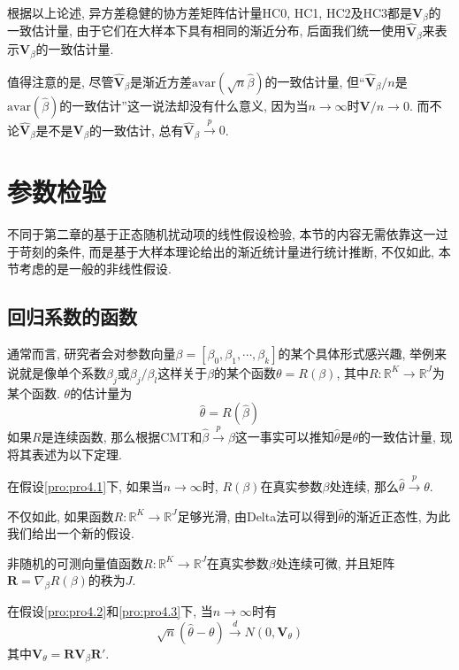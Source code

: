 \documentclass[cn, 12pt, math=mtpro2, bibstyle=apa, blue, twocol]{elegantbook}
\newcommand{\R}{\mathbb{R}}
\newcommand{\hb}{\hat{\beta}}
\newcommand{\V}{\mathbold{V}}
\begin{document}
根据以上论述, 异方差稳健的协方差矩阵估计量HC0, HC1, HC2及HC3都是$\V_\beta$的一致估计量, 由于它们在大样本下具有相同的渐近分布, 后面我们统一使用$\hat{\V}_\beta$来表示$\V_{\beta}$的一致估计量.

值得注意的是, 尽管$\hat{\V}_\beta$是渐近方差$\text{avar}(\sqrt{n}\hb)$的一致估计量, 但“$\hat{\V}_{\beta}/n$是$\text{avar}(\hb)$的一致估计”这一说法却没有什么意义, 因为当$n\to\infty$时$\V/n\to0$. 而不论$\hat{\V}_\beta$是不是$\V_\beta$的一致估计, 总有$\hat{\V}_\beta\xrightarrow{p}0$.
\section{参数检验}
不同于第二章的基于正态随机扰动项的线性假设检验, 本节的内容无需依靠这一过于苛刻的条件, 而是基于大样本理论给出的渐近统计量进行统计推断, 不仅如此, 本节考虑的是一般的非线性假设.
\subsection{回归系数的函数}

通常而言, 研究者会对参数向量$\beta=[\beta_0,\beta_1,\cdots,\beta_k]$的某个具体形式感兴趣, 举例来说就是像单个系数$\beta_j$或$\beta_j/\beta_l$这样关于$\beta$的某个函数$\theta=R(\beta)$, 其中$R:\R^K\to\R^J$为某个函数. $\theta$的估计量为
$$\hat{\theta}=R(\hat{\beta})$$
如果$R$是连续函数, 那么根据CMT和$\hat{\beta}\xrightarrow{p}\beta$这一事实可以推知$\hat{\theta}$是$\theta$的一致估计量, 现将其表述为以下定理.
\begin{theorem}
  在假设\ref{pro:pro4.1}下, 如果当$n\to\infty$时, $R(\beta)$在真实参数$\beta$处连续, 那么$\hat{\theta}\xrightarrow{p}\theta$.
\end{theorem}

不仅如此, 如果函数$R:\R^K\to\R^J$足够光滑, 由Delta法可以得到$\hat{\theta}$的渐近正态性, 为此我们给出一个新的假设.
\begin{proposition}\label{pro:pro4.3}
非随机的可测向量值函数$R:\R^K\to\R^J$在真实参数$\beta$处连续可微, 并且矩阵$\mathbold{R}=\nabla_\beta R(\beta)$的秩为$J$.
\end{proposition}
\begin{theorem}\label{thm:thm4.5}
  在假设\ref{pro:pro4.2}和\ref{pro:pro4.3}下, 当$n\to\infty$时有
  \begin{equation}\label{eq4.15}
    \sqrt{n}(\hat{\theta}-\theta)\xrightarrow{d}N(0,\V_\theta)
  \end{equation}
  其中$\V_\theta=\mathbold{R}\V_\beta\mathbold{R}'$.
\end{theorem}
\end{document}
